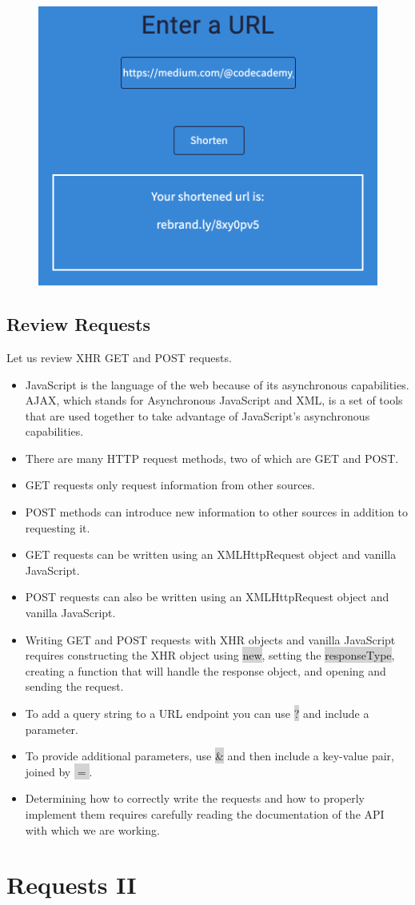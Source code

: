 \documentclass[11pt]{article}
\begin{document}
\begin{figure}[H]
\includegraphics[scale = 0.5]{17_5}
\centering
\end{figure}

\subsection{Review Requests}
Let us review XHR GET and POST requests.
\begin{itemize}[leftmargin = *]
\item JavaScript is the language of the web because of its asynchronous capabilities. AJAX, which stands for Asynchronous JavaScript and XML, is a set of tools that are used together to take advantage of JavaScript’s asynchronous capabilities.
\item There are many HTTP request methods, two of which are GET and POST.
\item GET requests only request information from other sources.
\item POST methods can introduce new information to other sources in addition to requesting it.
\item GET requests can be written using an XMLHttpRequest object and vanilla JavaScript.
\item POST requests can also be written using an XMLHttpRequest object and vanilla JavaScript.
\item Writing GET and POST requests with XHR objects and vanilla JavaScript requires constructing the XHR object using \colorbox{lightgray}{new}, setting the \colorbox{lightgray}{responseType}, creating a function that will handle the response object, and opening and sending the request.
\item To add a query string to a URL endpoint you can use \colorbox{lightgray}{?} and include a parameter.
\item To provide additional parameters, use \colorbox{lightgray}{\&} and then include a key-value pair, joined by \colorbox{lightgray}{$=$}.
\item Determining how to correctly write the requests and how to properly implement them requires carefully reading the documentation of the API with which we are working.
\end{itemize}

\newpage
\section{Requests II}
\end{document}
